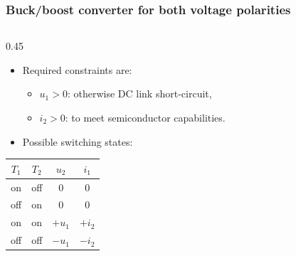 \begin{frame}
	\frametitle{Buck/boost converter for both voltage polarities}
	\begin{columns}
		\begin{column}{0.45\textwidth}
			\begin{itemize}
				\item Required constraints are:
				      \begin{itemize}
					      \item $u_1>0$: otherwise DC link short-circuit,
					      \item $i_2>0$: to meet semiconductor capabilities.
				      \end{itemize}
				\item<2-> Possible switching states:
			\end{itemize}
			\begin{center}
				\begin{tabular}{c c c c}
					\toprule
					$T_1$ & $T_2$ & $u_2$  & $i_1$  \\
					\midrule
					on    & off   & $0$    & $0$    \\
					off   & on    & $0$    & $0$    \\
					on    & on    & $+u_1$ & $+i_2$ \\
					off   & off   & $-u_1$ & $-i_2$ \\
					\bottomrule
				\end{tabular}
			\end{center}


\end{column}
\end{columns}
\end{frame}
